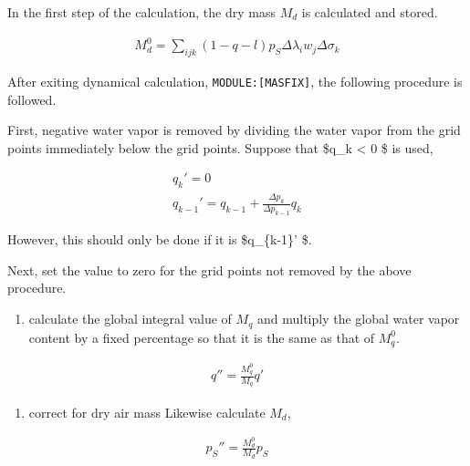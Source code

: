 In the first step of the calculation, the dry mass \(M_d\) is calculated
and stored.

\begin{eqnarray}
  M_d^0 = \sum_{ijk} (1-q-l) p_S \Delta\lambda_i w_j \Delta\sigma_k
\end{eqnarray}

After exiting dynamical calculation, \texttt{MODULE:{[}MASFIX{]}}, the
following procedure is followed.

First, negative water vapor is removed by dividing the water vapor from
the grid points immediately below the grid points. Suppose that \$q\_k
\textless{} 0 \$ is used,

\begin{eqnarray}
        q_k'      =  0          \\
        q_{k-1}'  =  q_{k-1} + \frac{\Delta p_k}{\Delta p_{k-1}} q_k
\end{eqnarray}

However, this should only be done if it is \$q\_\{k-1\}'  \$.

Next, set the value to zero for the grid points not removed by the above
procedure.

\begin{enumerate}
\def\labelenumi{\arabic{enumi}.}
\setcounter{enumi}{2}
\tightlist
\item
  calculate the global integral value of \(M_q\) and multiply the global
  water vapor content by a fixed percentage so that it is the same as
  that of \(M_q^0\).
\end{enumerate}

\begin{eqnarray}
        q'' = \frac{M_q^0}{M_q} q'
\end{eqnarray}

\begin{enumerate}
\def\labelenumi{\arabic{enumi}.}
\setcounter{enumi}{3}
\tightlist
\item
  correct for dry air mass Likewise calculate \(M_d\),
\end{enumerate}

\begin{eqnarray}
        p_S'' = \frac{M_d^0}{M_d} p_S
\end{eqnarray}
